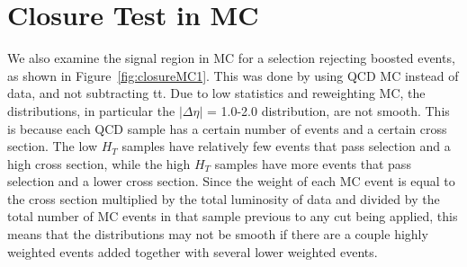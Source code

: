 
\section{Closure Test in MC\label{ss:BkgValInMC}}

We also examine the signal region in MC for a selection rejecting boosted events, as shown in Figure~\ref{fig:closureMC1}. This was done by using QCD MC instead of data, and not subtracting tt. Due to low statistics and reweighting MC, the distributions, in particular the $|\Delta\eta|$ = 1.0-2.0 distribution, are not smooth. This is because each QCD sample has a certain number of events and a certain cross section. The low $H_{T}$ samples have relatively few events that pass selection and a high cross section, while the high $H_{T}$ samples have more events that pass selection and a lower cross section. Since the weight of each MC event is equal to the cross section multiplied by the total luminosity of data and divided by the total number of MC events in that sample previous to any cut being applied, this means that the distributions may not be smooth if there are a couple highly weighted events added together with several lower weighted events.

